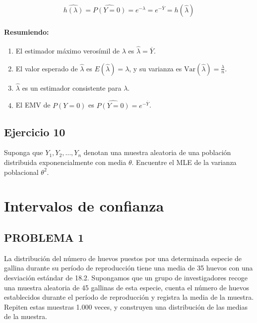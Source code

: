 \documentclass[
]{article}
\providecommand{\tightlist}{%
  \setlength{\itemsep}{0pt}\setlength{\parskip}{0pt}}
\begin{document}
\[
\widehat{h(\lambda)} =
\widehat{P(Y=0)} = e^{-\hat{\lambda}} = e^{-\overline{Y}}=h(\hat\lambda)
\]

\paragraph{Resumiendo:}\label{resumiendo}

\begin{enumerate}
\def\labelenumi{\arabic{enumi}.}
\tightlist
\item
  El estimador máximo verosímil de \(\lambda\) es \(\hat{\lambda} = \overline{Y}\).
\item
  El valor esperado de \(\hat{\lambda}\) es \(E(\hat{\lambda}) = \lambda\), y su varianza es \(\text{Var}(\hat{\lambda}) = \frac{\lambda}{n}\).
\item
  \(\hat{\lambda}\) es un estimador consistente para \(\lambda\).
\item
  El EMV de \(P(Y = 0)\) es \(\widehat{P(Y = 0)} = e^{-\overline{Y}}\).
\end{enumerate}

\subsection{Ejercicio 10}\label{ejercicio-10-1}

Suponga que \(Y_{1}, Y_{2}, \ldots, Y_{n}\) denotan una muestra aleatoria de una población distribuida exponencialmente con media \(\theta\). Encuentre el MLE de la varianza poblacional \(\theta^{2}\).

\section{Intervalos de confianza}\label{intervalos-de-confianza}

\subsection{PROBLEMA 1}\label{problema-1-1}

La distribución del número de huevos puestos por una determinada especie de gallina durante su período de reproducción tiene una media de 35 huevos con una desviación estándar de 18.2. Supongamos que un grupo de investigadores recoge una muestra aleatoria de 45 gallinas de esta especie, cuenta el número de huevos establecidos durante el período de reproducción y registra la media de la muestra. Repiten estas muestras 1.000 veces, y construyen una distribución de las medias de la muestra.
\end{document}
